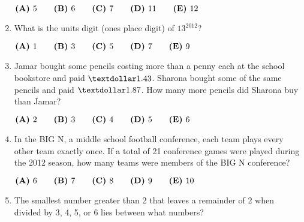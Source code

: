 \documentclass{article}
\begin{document}
\begin{enumerate}[label=\arabic*., itemsep=0.5em]
\( \textbf{(A)}\hspace{.05in}5\qquad\textbf{(B)}\hspace{.05in}6\qquad\textbf{(C)}\hspace{.05in}7\qquad\textbf{(D)}\hspace{.05in}11\qquad\textbf{(E)}\hspace{.05in}12 \)\par \vspace{0.5em}\item What is the units digit (ones place digit) of  \(13^{2012}\)?

\( \textbf{(A)}\hspace{.05in}1\qquad\textbf{(B)}\hspace{.05in}3\qquad\textbf{(C)}\hspace{.05in}5\qquad\textbf{(D)}\hspace{.05in}7\qquad\textbf{(E)}\hspace{.05in}9 \)\par \vspace{0.5em}\item Jamar bought some pencils costing more than a penny each at the school bookstore and paid \( 
\textdollar 1.43 \). Sharona bought some of the same pencils and paid \( \textdollar 1.87 \). How many more pencils did Sharona buy than Jamar?

\( \textbf{(A)}\hspace{.05in}2\qquad\textbf{(B)}\hspace{.05in}3\qquad\textbf{(C)}\hspace{.05in}4\qquad\textbf{(D)}\hspace{.05in}5\qquad\textbf{(E)}\hspace{.05in}6 \)\par \vspace{0.5em}\item In the BIG N, a middle school football conference, each team plays every other team exactly once. If a total of 21 conference games were played during the 2012 season, how many teams were members of the BIG N conference?

\( \textbf{(A)}\hspace{.05in}6\qquad\textbf{(B)}\hspace{.05in}7\qquad\textbf{(C)}\hspace{.05in}8\qquad\textbf{(D)}\hspace{.05in}9\qquad\textbf{(E)}\hspace{.05in}10 \)\par \vspace{0.5em}\item The smallest number greater than 2 that leaves a remainder of 2 when divided by 3, 4, 5, or 6 lies between what numbers?


\end{enumerate}
\end{document}
